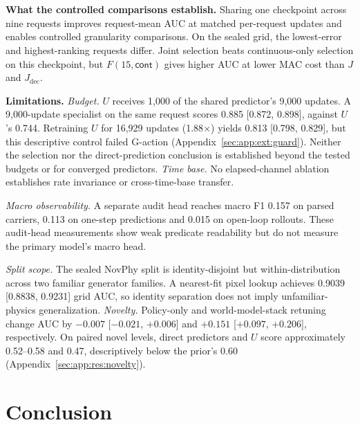 \section{\texorpdfstring{}{Discussion and Limitations}}
\label{sec:disc}

\begin{revblock}\nopagebreak
\textbf{What the controlled comparisons establish.} Sharing one checkpoint across nine requests improves request-mean AUC at matched per-request updates and enables controlled granularity comparisons. On the sealed grid, the lowest-error and highest-ranking requests differ. Joint selection beats continuous-only selection on this checkpoint, but $F(15,\textsf{cont})$ gives higher AUC at lower MAC cost than $J$ and $J_{\mathrm{dec}}$.

\textbf{Limitations.} \emph{Budget.} $U$ receives 1,000 of the shared predictor's 9,000 updates. A 9,000-update specialist on the same request scores 0.885 [0.872, 0.898], against $U$'s 0.744. Retraining $U$ for 16,929 updates (1.88$\times$) yields 0.813 [0.798, 0.829], but this descriptive control failed G-action (Appendix~\ref{sec:app:ext:guard}). Neither the selection nor the direct-prediction conclusion is established beyond the tested budgets or for converged predictors. \emph{Time base.} No elapsed-channel ablation establishes rate invariance or cross-time-base transfer.

\emph{Macro observability.} A separate audit head reaches macro F1 0.157 on parsed carriers, 0.113 on one-step predictions and 0.015 on open-loop rollouts. These audit-head measurements show weak predicate readability but do not measure the primary model's macro head.

\emph{Split scope.} The sealed NovPhy split is identity-disjoint but within-distribution across two familiar generator families. A nearest-fit pixel lookup achieves 0.9039 [0.8838, 0.9231] grid AUC, so identity separation does not imply unfamiliar-physics generalization. \emph{Novelty.} Policy-only and world-model-stack retuning change AUC by $-0.007$ [$-0.021$, $+0.006$] and $+0.151$ [$+0.097$, $+0.206$], respectively. On paired novel levels, direct predictors and $U$ score approximately 0.52--0.58 and 0.47, descriptively below the prior's 0.60 (Appendix~\ref{sec:app:res:novelty}).
\end{revblock}

\section{Conclusion}
\label{sec:disc:conclusion}

